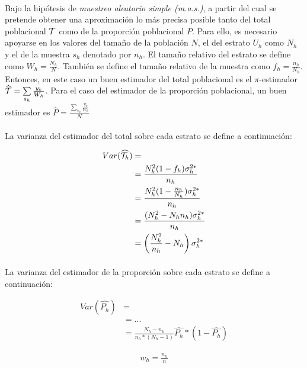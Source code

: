 \documentclass{article}
\begin{document}
    \paragraph{}
    Bajo la hipótesis de \emph{muestreo aleatorio simple (m.a.s.)}, a partir del cual se pretende obtener una aproximación lo más precisa posible tanto del total poblacional $\mathcal{T}$ como de la proporción poblacional $P$. Para ello, es necesario apoyarse en los valores del tamaño de la población $N$, el del estrato $U_h$ como $N_h$ y el de la muestra $s_h$ denotado por $n_h$. El tamaño relativo del estrato se define como $W_h = \frac{N_h}{N}$. También se define el tamaño relativo de la muestra como $f_h = \frac{n_h}{N_h}$. Entonces, en este caso un buen estimador del total poblacional es el $\pi$-estimador $\widehat{\mathcal{T}} = \sum\limits_{s_h} \frac{y_k}{W_h}$. Para el caso del estimador de la proporción poblacional, un buen estimador es $\widehat{P} = \frac{\sum\limits_{s_h} \frac{y_k}{W_h}}{N}$

    \paragraph{}
    La varianza del estimador del total sobre cada estrato se define a continuación:

    \begin{align}
      Var(\widehat{\mathcal{T}_h}) &= \\
      &=\frac{N_h^2 (1-f_h)\sigma_h^{2*}}{n_h} \\
      &= \frac{N_h^2 (1-\frac{n_h}{N_h})\sigma_h^{2*}}{n_h} \\
      &= \frac{(N_h^2- N_hn_h)\sigma_h^{2*}}{n_h} \\
      &= \left(\frac{N_h^2}{n_h}- N_h\right)\sigma_h^{2*}
    \end{align}

    \paragraph{}
    La varianza del estimador de la proporción sobre cada estrato se define a continuación:

    \begin{align}
      Var(\widehat{P_h}) &= \\
      &= ... \\
      &= \frac{N_h-n_h}{n_h*(N_h-1)}\widehat{P_h} * (1-\widehat{P_h})
    \end{align}


    \begin{align}
      w_h = \frac{n_h}{n}
    \end{align}
\end{document}
